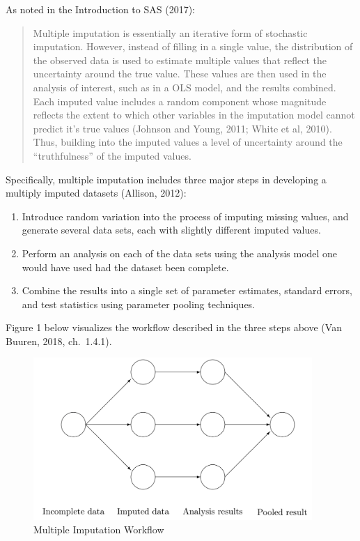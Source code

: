 \documentclass[12pt,oneside]{chicagocapstone}
\providecommand{\tightlist}{%
  \setlength{\itemsep}{0pt}\setlength{\parskip}{0pt}}
\begin{document}
As noted in the Introduction to SAS (2017):
\begin{quote}
Multiple imputation is essentially an iterative form of stochastic
imputation. However, instead of filling in a single value, the
distribution of the observed data is used to estimate multiple values
that reflect the uncertainty around the true value. These values are
then used in the analysis of interest, such as in a OLS model, and the
results combined. Each imputed value includes a random component whose
magnitude reflects the extent to which other variables in the imputation
model cannot predict it's true values (Johnson and Young, 2011; White et
al, 2010). Thus, building into the imputed values a level of uncertainty
around the ``truthfulness'' of the imputed values.
\end{quote}
Specifically, multiple imputation includes three major steps in
developing a multiply imputed datasets (Allison, 2012):
\begin{enumerate}
\def\labelenumi{\arabic{enumi}.}
\tightlist
\item
  Introduce random variation into the process of imputing missing
  values, and generate several data sets, each with slightly different
  imputed values.
\item
  Perform an analysis on each of the data sets using the analysis model
  one would have used had the dataset been complete.
\item
  Combine the results into a single set of parameter estimates, standard
  errors, and test statistics using parameter pooling techniques.
\end{enumerate}
Figure 1 below visualizes the workflow described in the three steps
above (Van Buuren, 2018, ch.~1.4.1).
\begin{figure}

{\centering \includegraphics[width=400px]{figure/multiple-imputation-workflow} 

}

\caption{Multiple Imputation Workflow}\label{fig:mutlipleimputationworkflow}
\end{figure}
\end{document}
